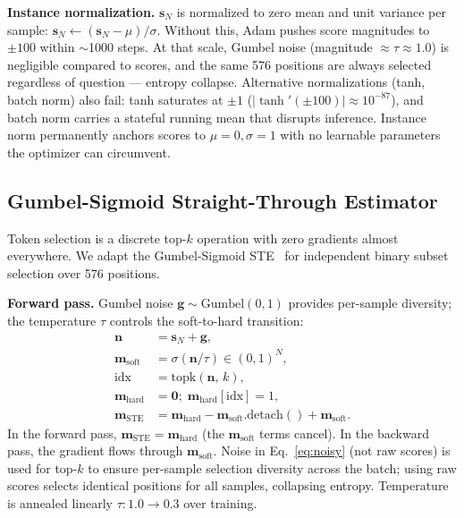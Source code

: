 \documentclass{article}
\newcommand{\sN}{\mathbf{s}_N}
\begin{document}
\textbf{Instance normalization.}
$\sN$ is normalized to zero mean and unit variance per sample:
$\sN \leftarrow (\sN - \mu) / \sigma$.
Without this, Adam pushes score magnitudes to $\pm100$ within $\sim$1000 steps.
At that scale, Gumbel noise (magnitude $\approx\tau \approx 1.0$) is negligible
compared to scores, and the same 576 positions are always selected regardless of
question — entropy collapse.
Alternative normalizations (tanh, batch norm) also fail:
tanh saturates at $\pm1$ ($|\tanh'(\pm100)| \approx 10^{-87}$),
and batch norm carries a stateful running mean that disrupts inference.
Instance norm permanently anchors scores to $\mu=0, \sigma=1$
with no learnable parameters the optimizer can circumvent.

\subsection{Gumbel-Sigmoid Straight-Through Estimator}
\label{sec:ste}

Token selection is a discrete top-$k$ operation with zero gradients almost everywhere.
We adapt the Gumbel-Sigmoid STE~\cite{jang2017categorical, bengio2013estimating}
for independent binary subset selection over 576 positions.

\textbf{Forward pass.} Gumbel noise $\mathbf{g} \sim \mathrm{Gumbel}(0,1)$ provides
per-sample diversity; the temperature $\tau$ controls the soft-to-hard transition:
\begin{align}
  \mathbf{n} &= \sN + \mathbf{g}, \label{eq:noisy} \\
  \mathbf{m}_{\mathrm{soft}} &= \sigma(\mathbf{n} / \tau) \in (0,1)^N, \label{eq:soft} \\
  \text{idx} &= \mathrm{topk}(\mathbf{n},\, k), \label{eq:topk} \\
  \mathbf{m}_{\mathrm{hard}} &= \mathbf{0};\; \mathbf{m}_{\mathrm{hard}}[\text{idx}] = 1, \label{eq:hard} \\
  \mathbf{m}_{\mathrm{STE}} &= \mathbf{m}_{\mathrm{hard}}
    - \mathbf{m}_{\mathrm{soft}}.\mathrm{detach}()
    + \mathbf{m}_{\mathrm{soft}}. \label{eq:ste}
\end{align}
In the forward pass, $\mathbf{m}_{\mathrm{STE}} = \mathbf{m}_{\mathrm{hard}}$
(the $\mathbf{m}_{\mathrm{soft}}$ terms cancel).
In the backward pass, the gradient flows through $\mathbf{m}_{\mathrm{soft}}$.
Noise in Eq.~\eqref{eq:noisy} (not raw scores) is used for top-$k$
to ensure per-sample selection diversity across the batch;
using raw scores selects identical positions for all samples, collapsing entropy.
Temperature is annealed linearly $\tau: 1.0 \to 0.3$ over training.
\end{document}
